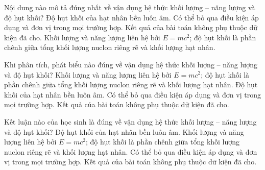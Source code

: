 \begin{ex}
Nội dung nào mô tả đúng nhất về vận dụng hệ thức khối lượng – năng lượng và độ hụt khối?
\choice
{Độ hụt khối của hạt nhân bền luôn âm.}
{Có thể bỏ qua điều kiện áp dụng và đơn vị trong mọi trường hợp.}
{Kết quả của bài toán không phụ thuộc dữ kiện đã cho.}
{\True Khối lượng và năng lượng liên hệ bởi $E=mc^2$; độ hụt khối là phần chênh giữa tổng khối lượng nuclon riêng rẽ và khối lượng hạt nhân.}
\end{ex}

\begin{ex}
Khi phân tích, phát biểu nào đúng về vận dụng hệ thức khối lượng – năng lượng và độ hụt khối?
\choice
{\True Khối lượng và năng lượng liên hệ bởi $E=mc^2$; độ hụt khối là phần chênh giữa tổng khối lượng nuclon riêng rẽ và khối lượng hạt nhân.}
{Độ hụt khối của hạt nhân bền luôn âm.}
{Có thể bỏ qua điều kiện áp dụng và đơn vị trong mọi trường hợp.}
{Kết quả của bài toán không phụ thuộc dữ kiện đã cho.}
\end{ex}

\begin{ex}
Kết luận nào của học sinh là đúng về vận dụng hệ thức khối lượng – năng lượng và độ hụt khối?
\choice
{Độ hụt khối của hạt nhân bền luôn âm.}
{\True Khối lượng và năng lượng liên hệ bởi $E=mc^2$; độ hụt khối là phần chênh giữa tổng khối lượng nuclon riêng rẽ và khối lượng hạt nhân.}
{Có thể bỏ qua điều kiện áp dụng và đơn vị trong mọi trường hợp.}
{Kết quả của bài toán không phụ thuộc dữ kiện đã cho.}
\end{ex}

